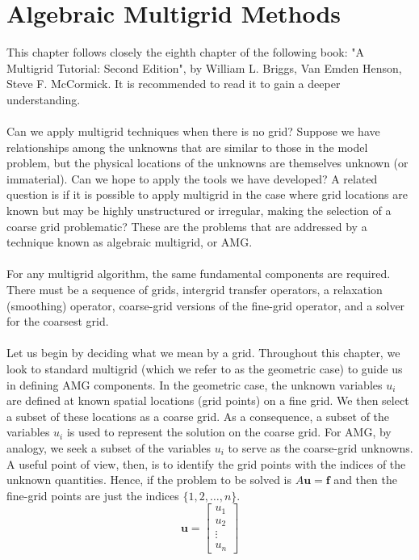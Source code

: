 \documentclass[11pt]{book}
\begin{document}
\chapter{Algebraic Multigrid Methods}
This chapter follows closely the eighth chapter of the following book: "A Multigrid Tutorial: Second Edition", by  William L. Briggs, Van Emden Henson, Steve F. McCormick. It is recommended to read it to gain a deeper understanding. \\ \\
Can we apply multigrid techniques when there is no grid? Suppose we have relationships among the unknowns that are similar to those in the model problem, but the physical locations of the unknowns are themselves unknown (or immaterial). Can we hope to apply the tools we have developed? A related question is if it is possible to apply multigrid in the case where grid locations are known but may be highly unstructured or irregular, making the selection of a coarse grid problematic? These are the problems that are addressed by a technique known as algebraic multigrid, or AMG. \\ \\
For any multigrid algorithm, the same fundamental components are required. There must be a sequence of grids, intergrid transfer operators, a relaxation (smoothing) operator, coarse-grid versions of the fine-grid operator, and a solver for the coarsest grid.\\ \\
Let us begin by deciding what we mean by a grid. Throughout this chapter, we look to standard multigrid (which we refer to as the geometric case) to guide us in defining AMG components. In the geometric case, the unknown variables $u_{i}$ are defined at known spatial locations (grid points) on a fine grid. We then select a subset of these locations as a coarse grid. As a consequence, a subset of the variables $u_{i}$ is used to represent the solution on the coarse grid. For AMG, by analogy, we seek a subset of the variables $u_{i}$ to serve as the coarse-grid unknowns. A useful point of view, then, is to identify the grid points with the indices of the unknown quantities. Hence, if the problem to be solved is $A \mathbf{u}=\mathbf{f}$ and then the fine-grid points are just the indices $\{1,2, \ldots, n\}$.
$$
\mathbf{u}=\left[\begin{array}{c}
u_{1} \\
u_{2} \\
\vdots \\
u_{n}
\end{array}\right]
$$
\end{document}
